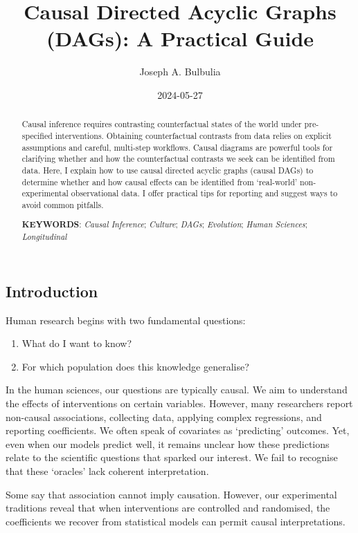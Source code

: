 \documentclass[
  single column]{article}
\title{Causal Directed Acyclic Graphs (DAGs): A Practical Guide}
\author{Joseph A. Bulbulia}
\affil{%
             \small{     Victoria University of Wellington, New Zealand
          ORCID \textcolor[HTML]{A6CE39}{\aiOrcid} ~0000-0002-5861-2056 }
              }
\date{2024-05-27}
\providecommand{\tightlist}{%
  \setlength{\itemsep}{0pt}\setlength{\parskip}{0pt}}\usepackage{longtable,booktabs,array}
\begin{document}
\maketitle
\begin{abstract}
Causal inference requires contrasting counterfactual states of the world
under pre-specified interventions. Obtaining counterfactual contrasts
from data relies on explicit assumptions and careful, multi-step
workflows. Causal diagrams are powerful tools for clarifying whether and
how the counterfactual contrasts we seek can be identified from data.
Here, I explain how to use causal directed acyclic graphs (causal DAGs)
to determine whether and how causal effects can be identified from
`real-world' non-experimental observational data. I offer practical tips
for reporting and suggest ways to avoid common pitfalls.

\textbf{KEYWORDS}: \emph{Causal Inference}; \emph{Culture}; \emph{DAGs};
\emph{Evolution}; \emph{Human Sciences}; \emph{Longitudinal}
\end{abstract}

\subsection{Introduction}\label{id-sec-introduction}

Human research begins with two fundamental questions:

\begin{enumerate}
\def\labelenumi{\arabic{enumi}.}
\tightlist
\item
  What do I want to know?
\item
  For which population does this knowledge generalise?
\end{enumerate}

In the human sciences, our questions are typically causal. We aim to
understand the effects of interventions on certain variables. However,
many researchers report non-causal associations, collecting data,
applying complex regressions, and reporting coefficients. We often speak
of covariates as `predicting' outcomes. Yet, even when our models
predict well, it remains unclear how these predictions relate to the
scientific questions that sparked our interest. We fail to recognise
that these `oracles' lack coherent interpretation.

Some say that association cannot imply causation. However, our
experimental traditions reveal that when interventions are controlled
and randomised, the coefficients we recover from statistical models can
permit causal interpretations.
\end{document}
